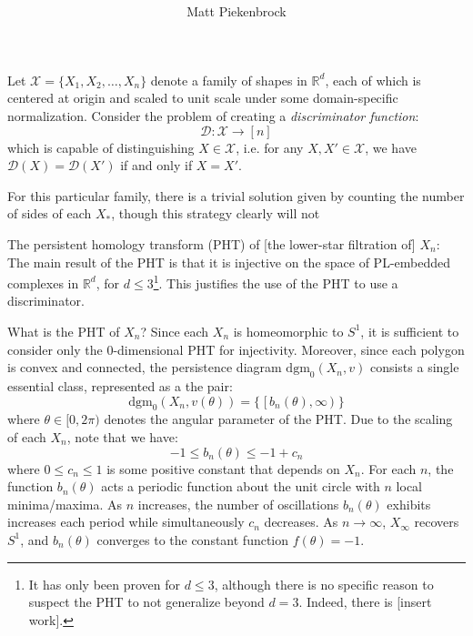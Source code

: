 \documentclass[10pt]{article}
\title{\vspace{-2.0em} \vspace{-0.5em}}
\author{Matt Piekenbrock}
\date{}
\begin{document}
 \vspace{-2em} \maketitle \vspace{-1em}
\noindent
Let $\mathcal{X} = \{ X_1, X_2, \dots, X_n \}$ denote a family of shapes in $\mathbb{R}^d$, each of which is centered at origin and scaled to unit scale under some domain-specific normalization.  Consider the problem of creating a \emph{discriminator function}:
$$ \mathcal{D}: \mathcal{X} \to [n] $$
which is capable of distinguishing $X \in \mathcal{X}$, i.e. for any $X, X' \in \mathcal{X}$, we have $\mathcal{D}(X) = \mathcal{D}(X')$ if and only if $X = X'$. 

For this particular family, there is a trivial solution given by counting the number of sides of each $X_\ast$, though this strategy clearly will not 


The persistent homology transform (PHT) of [the lower-star filtration of] $X_n$: 
$$ $$
The main result of the PHT is that it is injective on the space of PL-embedded complexes in $\mathbb{R}^d$, for $d \leq 3$\footnote{It has only been proven for $d \leq 3$, although there is no specific reason to suspect the PHT to not generalize beyond $d = 3$. Indeed, there is [insert work].}. 
This justifies the use of the PHT to use a discriminator. 

What is the PHT of $X_n$? Since each $X_n$ is homeomorphic to $S^1$, it is sufficient to consider only the $0$-dimensional PHT for injectivity. Moreover, since each polygon is convex and connected, the persistence diagram $\mathrm{dgm}_0(X_n, v)$ consists a single essential class, represented as a the pair: 
$$ \mathrm{dgm}_0(X_n, v(\theta)) = \{ \; [\,b_n(\theta), \infty \,) \; \}$$
where $\theta \in [0, 2 \pi )$ denotes the angular parameter of the PHT. Due to the scaling of each $X_n$, note that we have:
$$
-1 \leq b_n(\theta) \leq -1 + c_n
$$
where $0 \leq c_n \leq 1$ is some positive constant that depends on $X_n$. For each $n$, the function $b_n(\theta)$ acts a periodic function about the unit circle with $n$ local minima/maxima. As $n$ increases, the number of oscillations $b_n(\theta)$ exhibits increases each period while simultaneously $c_n$ decreases. As $n \to \infty$, $X_\infty$ recovers $S^1$, and $b_n(\theta)$ converges to the constant function $f(\theta) = -1$.   
\end{document}
